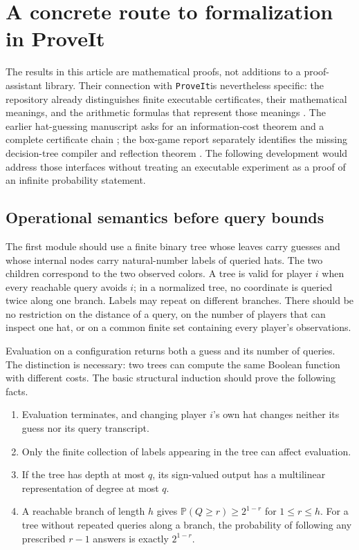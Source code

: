 \documentclass[11pt,letterpaper]{article}
\theoremstyle{definition}
\newcommand{\repo}{\texttt{ProveIt}}
\begin{document}
\section{A concrete route to formalization in ProveIt}
\label{mbg:insp:sec:formalization}

The results in this article are mathematical proofs, not additions to a
proof-assistant library.  Their connection with \repo is nevertheless
specific: the repository already distinguishes finite executable certificates,
their mathematical meanings, and the arithmetic formulas that represent those
meanings \cite{qry:ProveIt,qry:ListCoding}.  The earlier hat-guessing manuscript asks for
an information-cost theorem and a complete certificate chain
\cite{qry:PriorHat}; the box-game report separately identifies the missing
decision-tree compiler and reflection theorem \cite{qry:RepoBoxes}.  The following
development would address those interfaces without treating an executable
experiment as a proof of an infinite probability statement.

\subsection{Operational semantics before query bounds}

The first module should use a finite binary tree whose leaves carry guesses
and whose internal nodes carry natural-number labels of queried hats.  The
two children correspond to the two observed colors.  A tree is valid for
player \(i\) when every reachable query avoids \(i\); in a normalized tree,
no coordinate is queried twice along one branch.  Labels may repeat on
different branches.  There should be no restriction on the distance of a
query, on the number of players that can inspect one hat, or on a common
finite set containing every player's observations.

Evaluation on a configuration returns both a guess and its number of queries.
The distinction is necessary: two trees can compute the same Boolean function
with different costs.  The basic structural induction should prove the
following facts.

\begin{enumerate}
\item Evaluation terminates, and changing player \(i\)'s own hat changes
neither its guess nor its query transcript.
\item Only the finite collection of labels appearing in the tree can affect
evaluation.
\item If the tree has depth at most \(q\), its sign-valued output has a
multilinear representation of degree at most \(q\).
\item A reachable branch of length \(h\) gives
\(\mathbb P(Q\ge r)\ge 2^{1-r}\) for \(1\le r\le h\).
For a tree without repeated queries along a branch, the probability of
following any prescribed \(r-1\) answers is exactly \(2^{1-r}\).
\end{enumerate}
\end{document}

